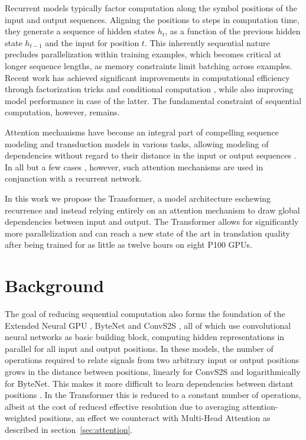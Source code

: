 \documentclass{article}
\begin{document}
Recurrent models typically factor computation along the symbol positions of the input and output sequences. Aligning the positions to steps in computation time, they generate a sequence of hidden states $h_t$, as a function of the previous hidden state $h_{t-1}$ and the input for position $t$. This inherently sequential nature precludes parallelization within training examples, which becomes critical at longer sequence lengths, as memory constraints limit batching across examples.
Recent work has achieved significant improvements in computational efficiency through factorization tricks \citep{Kuchaiev2017Factorization} and conditional computation \citep{shazeer2017outrageously}, while also improving model performance in case of the latter. The fundamental constraint of sequential computation, however, remains.

Attention mechanisms have become an integral part of compelling sequence modeling and transduction models in various tasks, allowing modeling of dependencies without regard to their distance in the input or output sequences \citep{bahdanau2014neural, structuredAttentionNetworks}. In all but a few cases \citep{decomposableAttnModel}, however, such attention mechanisms are used in conjunction with a recurrent network.

In this work we propose the Transformer, a model architecture eschewing recurrence and instead relying entirely on an attention mechanism to draw global dependencies between input and output. The Transformer allows for significantly more parallelization and can reach a new state of the art in translation quality after being trained for as little as twelve hours on eight P100 GPUs. 

\section{Background}

The goal of reducing sequential computation also forms the foundation of the Extended Neural GPU \citep{extendedngpu}, ByteNet \citep{NalBytenet2017} and ConvS2S \citep{JonasFaceNet2017}, all of which use convolutional neural networks as basic building block, computing hidden representations in parallel for all input and output positions. In these models, the number of operations required to relate signals from two arbitrary input or output positions grows in the distance between positions, linearly for ConvS2S and logarithmically for ByteNet. This makes it more difficult to learn dependencies between distant positions \citep{hochreiter2001gradient}. In the Transformer this is reduced to a constant number of operations, albeit at the cost of reduced effective resolution due to averaging attention-weighted positions, an effect we counteract with Multi-Head Attention as described in section~\ref{sec:attention}. 
\end{document}
